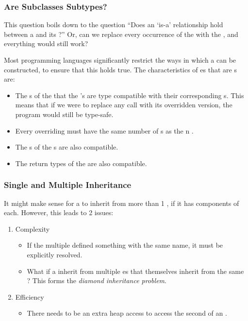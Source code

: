 \subsubsection{Are Subclasses Subtypes?}\label{subsubsec:OOP_Subclasses_Subtypes}
This question boils down to the question ``Does an `is-a' relationship hold between a  and its ?''
Or, can we replace every occurrence of the  with the , and everything would still work?

Most programming languages significantly restrict the ways in which a  can be constructed, to ensure that this holds true.
The characteristics of es that are s are:
\begin{itemize}[noitemsep]
\item The s of the  that  the 's are type compatible with their corresponding s.
  This means that if we were to replace any call with its overridden version, the program would still be type-safe.
\item Every overriding  must have the same number of s as the n .
\item The s of the s are also compatible.
\item The return types of the  are also compatible.
\end{itemize}

\subsubsection{Single and Multiple Inheritance}\label{subsubsec:OOP_Single_Multiple_Inheritance}
It might make sense for a  to inherit from more than 1 , if it has components of each.
However, this leads to 2 issues:
\begin{enumerate}[noitemsep]
\item Complexity
  \begin{itemize}[noitemsep]
  \item If the multiple  defined something with the same name, it must be explicitly resolved.
  \item What if a  inherit from multiple es that themselves inherit from the same ? This forms the \emph{diamond inheritance problem}.
  \end{itemize}
\item Efficiency
  \begin{itemize}[noitemsep]
  \item There needs to be an extra heap access to access the second  of an .
  \end{itemize}
\end{enumerate}

